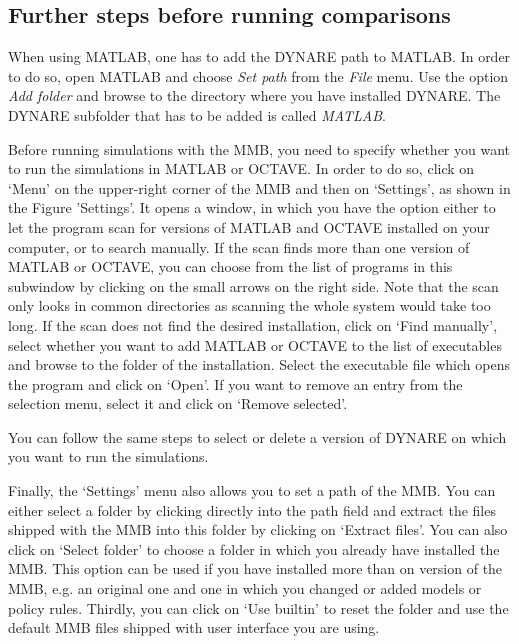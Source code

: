 \subsection*{Further steps before running comparisons}
When using MATLAB, one has to add the DYNARE path to MATLAB. In order to do so, open MATLAB and choose \textit{Set path} from the \textit{File} menu. Use the option \textit{Add folder} and browse to the directory where you have installed DYNARE. The DYNARE subfolder that has to be added is called \textit{MATLAB}.

Before running simulations with the MMB, you need to specify whether you want to run the simulations in MATLAB or OCTAVE. In order to do so, click on `Menu' on the upper-right corner of the MMB and then on `Settings', as shown in the Figure 'Settings'. It opens a window, in which you have the option either to let the program scan for versions of MATLAB and OCTAVE installed on your computer, or to search manually. If the scan finds more than one version of MATLAB or OCTAVE, you can choose from the list of programs in this subwindow by clicking on the small arrows on the right side. Note that the scan only looks in common directories as scanning the whole system would take too long. If the scan does not find the desired installation, click on `Find manually', select whether you want to add MATLAB or OCTAVE to the list of executables  and browse to the folder of the installation. Select the executable file which opens the program and click on `Open'. If you want to remove an entry from the selection menu, select it and click on `Remove selected'.

You can follow the same steps  to select or delete a version of DYNARE on which you want to run the simulations.

Finally, the `Settings' menu also allows you to set a path of the MMB. You can either select a folder by clicking directly into the path field and extract the files shipped with the MMB into this folder by clicking on `Extract files'. You can also click on `Select folder' to choose a folder in which you already have installed the MMB. This option can be used if you have installed more than on version of the MMB, e.g. an original one and one in which you changed  or added models or policy rules. Thirdly, you can click on `Use builtin' to reset the folder and use the default MMB files shipped with user interface you are using.

